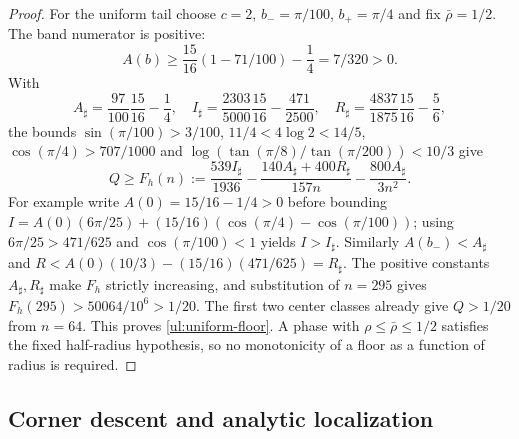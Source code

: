 \begin{proof}
For the uniform tail choose $c=2$, $b_-=\pi/100$,
$b_+=\pi/4$ and fix $\bar\rho=1/2$. The band numerator is positive:
\[
 A(b)\geq\frac{15}{16}(1-71/100)-\frac14=7/320>0.
\]
With
\[
 A_\sharp =\frac{97}{100}\frac{15}{16}-\frac14,\quad
 I_\sharp =\frac{2303}{5000}\frac{15}{16}-\frac{471}{2500},\quad
 R_\sharp =\frac{4837}{1875}\frac{15}{16}-\frac56,
\]
the bounds $\sin(\pi/100)>3/100$, $11/4<4\log2<14/5$,
$\cos(\pi/4)>707/1000$ and
$\log(\tan(\pi/8)/\tan(\pi/200))<10/3$ give
\[
 Q\geq F_h(n):=\frac{539I_\sharp}{1936}
              -\frac{140A_\sharp+400R_\sharp}{157n}
              -\frac{800A_\sharp}{3n^2}.
\]
For example write $A(0)=15/16-1/4>0$ before bounding
$I=A(0)(6\pi/25)+(15/16)(\cos(\pi/4)-\cos(\pi/100))$;
using $6\pi/25>471/625$ and $\cos(\pi/100)<1$ yields $I>I_\sharp$.
Similarly $A(b_-)<A_\sharp$ and
$R<A(0)(10/3)-(15/16)(471/625)=R_\sharp$.
The positive constants $A_\sharp,R_\sharp$ make $F_h$ strictly increasing,
and substitution of $n=295$ gives $F_h(295)>50064/10^6>1/20$.
The first two center classes already give $Q>1/20$ from $n=64$.
This proves \eqref{ul:uniform-floor}. A phase with
$\rho\leq\bar\rho\leq1/2$ satisfies the fixed half-radius hypothesis,
so no monotonicity of a floor as a function of radius is required.
\end{proof}

\subsection{Corner descent and analytic localization}

